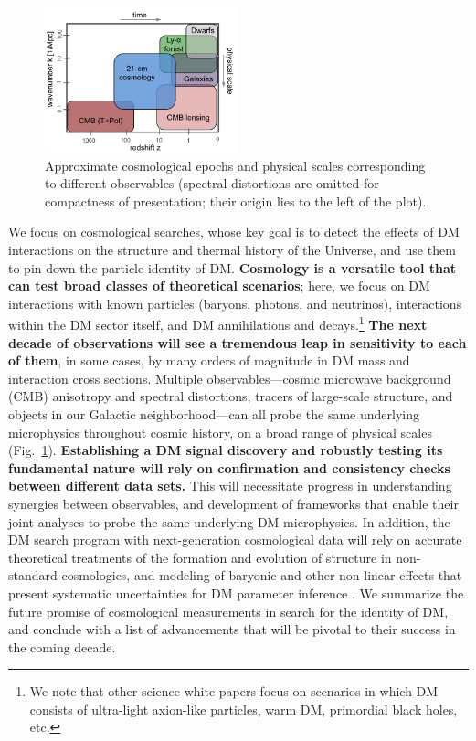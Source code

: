 \documentclass[12pt]{article}
\begin{document}
\begin{figure}
\begin{center}
\vspace{-0.9cm}
\includegraphics[width=0.5\textwidth]{scales.png}
\end{center}
\vspace{-0.8cm}
\caption{Approximate cosmological epochs and physical scales corresponding to different observables (spectral distortions are omitted for compactness of presentation; their origin lies to the left of the plot).}
\vspace{-0.2cm}
\label{fig:scales}
\end{figure}
We focus on cosmological searches, whose key goal is to detect the effects of DM interactions on the structure and thermal history of the Universe, and use them to pin down the particle identity of DM.
\textbf{Cosmology is a versatile tool that can test broad classes of theoretical scenarios}; here, we focus on DM interactions with known particles (baryons, photons, and neutrinos), interactions within the DM sector itself, and DM annihilations and decays.\footnote{We note that other science white papers focus on scenarios in which DM consists of ultra-light axion-like particles, warm DM, primordial black holes, etc.}
\textbf{The next decade of observations will see a tremendous leap in sensitivity to each of them}, in some cases, by many orders of magnitude in DM mass and interaction cross sections.
Multiple observables---cosmic microwave background (CMB) anisotropy and spectral distortions, tracers of large-scale structure, and objects in our Galactic neighborhood---can all probe the same underlying microphysics throughout cosmic history, on a broad range of physical scales (Fig.~\ref{fig:scales}).
\textbf{Establishing a DM signal discovery and robustly testing its fundamental nature will rely on confirmation and consistency checks between different data sets.}
This will necessitate progress in understanding synergies between observables, and development of frameworks that enable their joint analyses to probe the same underlying DM microphysics.
In addition, the DM search program with next-generation cosmological data will rely on accurate theoretical treatments of the formation and evolution of structure in non-standard cosmologies, and modeling of baryonic and other non-linear effects that present systematic uncertainties for DM parameter inference \cite{2019arXiv190201055D,2018PhRvD..98h3540M,AliHaimoud_19}.
We summarize the future promise of cosmological measurements in search for the identity of DM, and conclude with a list of advancements that will be pivotal to their success in the coming decade.
\vspace{-0.4cm}
\end{document}
